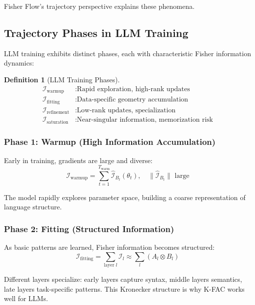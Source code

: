\documentclass[11pt]{article}
\newtheorem{definition}[theorem]{Definition}
\begin{document}
Fisher Flow's trajectory perspective explains these phenomena.

\subsection{Trajectory Phases in LLM Training}

LLM training exhibits distinct phases, each with characteristic Fisher information dynamics:

\begin{definition}[LLM Training Phases]
\begin{align}
\mathcal{I}_{\text{warmup}} &: \text{Rapid exploration, high-rank updates}\\
\mathcal{I}_{\text{fitting}} &: \text{Data-specific geometry accumulation}\\
\mathcal{I}_{\text{refinement}} &: \text{Low-rank updates, specialization}\\
\mathcal{I}_{\text{saturation}} &: \text{Near-singular information, memorization risk}
\end{align}
\end{definition}

\subsubsection{Phase 1: Warmup (High Information Accumulation)}

Early in training, gradients are large and diverse:
\begin{equation}
\mathcal{I}_{\text{warmup}} = \sum_{t=1}^{T_{\text{warm}}} \hat{\mathcal{I}}_{B_t}(\theta_t), \quad \|\hat{\mathcal{I}}_{B_t}\| \text{ large}
\end{equation}

The model rapidly explores parameter space, building a coarse representation of language structure.

\subsubsection{Phase 2: Fitting (Structured Information)}

As basic patterns are learned, Fisher information becomes structured:
\begin{equation}
\mathcal{I}_{\text{fitting}} = \sum_{\text{layer } l} \mathcal{I}_l \approx \sum_l (A_l \otimes B_l)
\end{equation}

Different layers specialize: early layers capture syntax, middle layers semantics, late layers task-specific patterns. This Kronecker structure is why K-FAC works well for LLMs.
\end{document}
